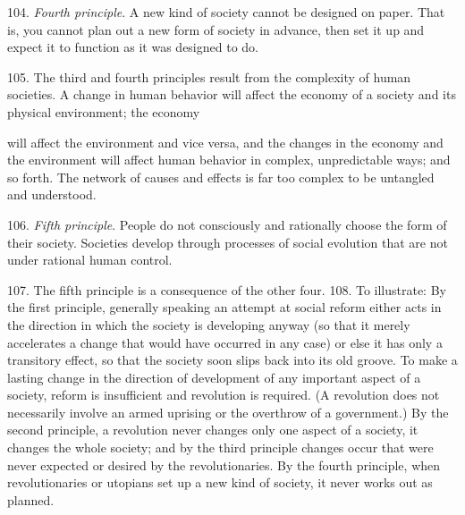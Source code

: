 \documentclass{article}
\begin{document}
104.  \textit{Fourth principle}.  A new kind of society cannot be designed on paper.  That is, you cannot 
plan out a new form of society in advance, then set it up and expect it to function as it was designed 
to do. \vspace{\baselineskip}

105.  The third and fourth principles result from the complexity of human societies.  A change in 
human behavior will affect the economy of a society and its physical environment; the economy 
 
will affect the environment and vice versa, and the changes in the economy and the environment 
will affect human behavior in complex, unpredictable ways; and so forth.  The network of causes 
and effects is far too complex to be untangled and understood. \vspace{\baselineskip}

106.  \textit{Fifth principle}.  People do not consciously and rationally choose the form of their 
society.  Societies develop through processes of social evolution that are not under rational human 
control. \vspace{\baselineskip} 

107.  The fifth principle is a consequence of the other four. 108.  To illustrate: By the first principle, generally speaking an attempt at social reform either acts 
in the direction in which the society is developing anyway (so that it merely accelerates a change 
that would have occurred in any case) or else it has only a transitory effect, so that the society soon 
slips back into its old groove.  To make a lasting change in the direction of development of any 
important aspect of a society, reform is insufficient and revolution is required.  (A revolution does 
not  necessarily  involve  an  armed  uprising  or  the  overthrow  of  a  government.)  By  the  second  
principle, a revolution never changes only one aspect of a society, it changes the whole society; 
and by the third principle changes occur that were never expected or desired by the 
revolutionaries.   By  the  fourth  principle,  when  revolutionaries  or  utopians  set  up  a  new  kind  of  
society, it never works out as planned. \vspace{\baselineskip}
\end{document}
